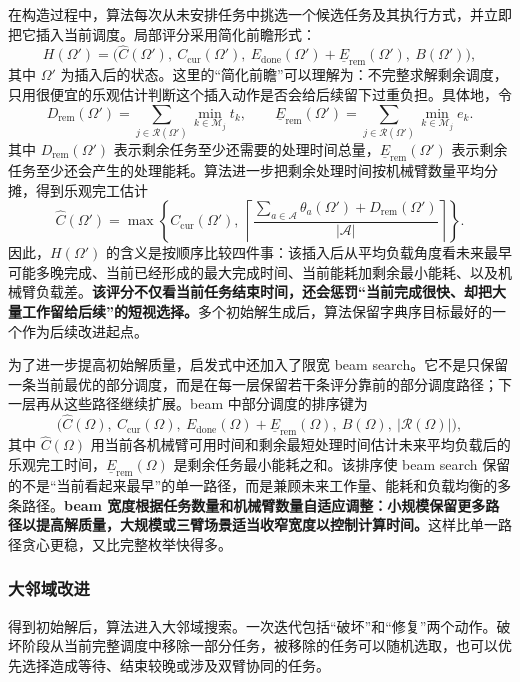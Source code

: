 在构造过程中，算法每次从未安排任务中挑选一个候选任务及其执行方式，并立即把它插入当前调度。局部评分采用简化前瞻形式：
\[
    H(\Omega')=
    \bigl(\widehat C(\Omega'),\ C_{\mathrm{cur}}(\Omega'),\
    E_{\mathrm{done}}(\Omega')+\underline E_{\mathrm{rem}}(\Omega'),\
    B(\Omega')\bigr),
\]
其中 $\Omega'$ 为插入后的状态。这里的“简化前瞻”可以理解为：不完整求解剩余调度，只用很便宜的乐观估计判断这个插入动作是否会给后续留下过重负担。具体地，令
\[
    D_{\mathrm{rem}}(\Omega')
    =
    \sum_{j\in\mathcal{R}(\Omega')}
    \min_{k\in\mathcal{M}_j} t_k,
    \qquad
    \underline E_{\mathrm{rem}}(\Omega')
    =
    \sum_{j\in\mathcal{R}(\Omega')}
    \min_{k\in\mathcal{M}_j} e_k .
\]
其中 $D_{\mathrm{rem}}(\Omega')$ 表示剩余任务至少还需要的处理时间总量，$\underline E_{\mathrm{rem}}(\Omega')$ 表示剩余任务至少还会产生的处理能耗。算法进一步把剩余处理时间按机械臂数量平均分摊，得到乐观完工估计
\[
    \widehat C(\Omega')
    =
    \max\left\{
    C_{\mathrm{cur}}(\Omega'),\
    \left\lceil
    \frac{\sum_{a\in\mathcal{A}}\theta_a(\Omega')+
    D_{\mathrm{rem}}(\Omega')}
    {|\mathcal{A}|}
    \right\rceil
    \right\}.
\]
因此，$H(\Omega')$ 的含义是按顺序比较四件事：该插入后从平均负载角度看未来最早可能多晚完成、当前已经形成的最大完成时间、当前能耗加剩余最小能耗、以及机械臂负载差。\textbf{该评分不仅看当前任务结束时间，还会惩罚“当前完成很快、却把大量工作留给后续”的短视选择。}多个初始解生成后，算法保留字典序目标最好的一个作为后续改进起点。

为了进一步提高初始解质量，启发式中还加入了限宽 beam search。它不是只保留一条当前最优的部分调度，而是在每一层保留若干条评分靠前的部分调度路径；下一层再从这些路径继续扩展。beam 中部分调度的排序键为
\[
    \bigl(\widehat C(\Omega),\ C_{\mathrm{cur}}(\Omega),\
    E_{\mathrm{done}}(\Omega)+\underline E_{\mathrm{rem}}(\Omega),\
    B(\Omega),\ |\mathcal{R}(\Omega)|\bigr),
\]
其中 $\widehat C(\Omega)$ 用当前各机械臂可用时间和剩余最短处理时间估计未来平均负载后的乐观完工时间，$\underline E_{\mathrm{rem}}(\Omega)$ 是剩余任务最小能耗之和。该排序使 beam search 保留的不是“当前看起来最早”的单一路径，而是兼顾未来工作量、能耗和负载均衡的多条路径。\textbf{beam 宽度根据任务数量和机械臂数量自适应调整：小规模保留更多路径以提高解质量，大规模或三臂场景适当收窄宽度以控制计算时间。}这样比单一路径贪心更稳，又比完整枚举快得多。

\subsubsection{大邻域改进}

得到初始解后，算法进入大邻域搜索。一次迭代包括“破坏”和“修复”两个动作。破坏阶段从当前完整调度中移除一部分任务，被移除的任务可以随机选取，也可以优先选择造成等待、结束较晚或涉及双臂协同的任务。


